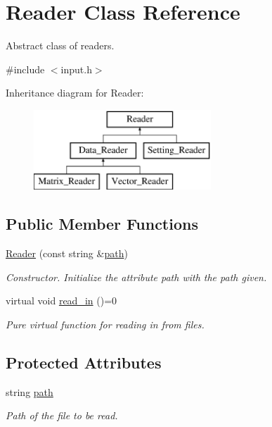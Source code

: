 \hypertarget{class_reader}{}\section{Reader Class Reference}
\label{class_reader}


Abstract class of readers.  




{\ttfamily \#include $<$input.\+h$>$}

Inheritance diagram for Reader\+:\begin{figure}[H]
\begin{center}
\leavevmode
\includegraphics[height=3.000000cm]{class_reader}
\end{center}
\end{figure}
\subsection*{Public Member Functions}
\begin{DoxyCompactItemize}
\item 
\mbox{\label{class_reader_a14282e3b34a1a2c8a8b2448a76edbf64}} 
\mbox{\hyperlink{class_reader_a14282e3b34a1a2c8a8b2448a76edbf64}{Reader}} (const string \&\mbox{\hyperlink{class_reader_a4f3eaccb117f248d4649ffb4e793a23d}{path}})
\begin{DoxyCompactList}\small\item\em Constructor. Initialize the attribute path with the path given. \end{DoxyCompactList}\item 
\mbox{\label{class_reader_ae95b8c18df56f806ca619f3d06326d63}} 
virtual void \mbox{\hyperlink{class_reader_ae95b8c18df56f806ca619f3d06326d63}{read\+\_\+in}} ()=0
\begin{DoxyCompactList}\small\item\em Pure virtual function for reading in from files. \end{DoxyCompactList}\end{DoxyCompactItemize}
\subsection*{Protected Attributes}
\begin{DoxyCompactItemize}
\item 
\mbox{\label{class_reader_a4f3eaccb117f248d4649ffb4e793a23d}} 
string \mbox{\hyperlink{class_reader_a4f3eaccb117f248d4649ffb4e793a23d}{path}}
\begin{DoxyCompactList}\small\item\em Path of the file to be read. \end{DoxyCompactList}\end{DoxyCompactItemize}


